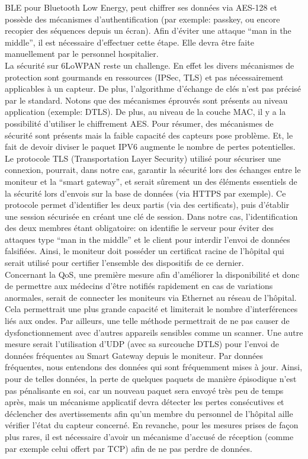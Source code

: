 \documentclass{article}
\begin{document}
BLE pour Bluetooth Low Energy, peut chiffrer ses données via AES-128 et possède des mécanismes d’authentification (par exemple: passkey,  ou encore recopier des séquences depuis un écran). Afin d’éviter une attaque “man in the middle”, il est nécessaire d’effectuer cette étape. Elle devra être faite manuellement par le personnel hospitalier.  
\\

La sécurité sur 6LoWPAN reste un challenge. En effet les divers mécanismes de protection sont gourmands en ressources (IPSec, TLS) et pas nécessairement applicables à un capteur. De plus, l’algorithme d’échange de clés n’est pas précisé par le standard. Notons que des mécanismes éprouvés sont présents au niveau application (exemple: DTLS). De plus, au niveau de la couche MAC, il y a la possibilité d’utiliser le chiffrement AES. Pour résumer, des mécanismes de sécurité sont présents mais la faible capacité des capteurs pose problème. Et, le fait de devoir diviser le paquet IPV6 augmente le nombre de pertes potentielles.
\\

Le protocole TLS (Transportation Layer Security) utilisé pour sécuriser une connexion, pourrait, dans notre cas, garantir la sécurité lors des échanges entre le moniteur et la “smart gateway”, et serait sûrement un des éléments essentiels de la sécurité lors d’envois sur la base de données (via HTTPS par exemple). Ce protocole permet d’identifier les deux partis (via des certificats), puis d’établir une session sécurisée en créant une clé de session. Dans notre cas, l’identification des deux membres étant obligatoire: on identifie le serveur pour éviter des attaques type “man in the middle” et le client pour interdir l’envoi de données falsifiées. Ainsi, le moniteur doit posséder un certificat racine de l’hôpital qui serait utilisé pour certifier l’ensemble des dispositifs de ce dernier.
\\

Concernant la QoS, une première mesure afin d’améliorer la disponibilité et donc de permettre aux médecins d’être notifiés rapidement en cas de variations anormales, serait de connecter les moniteurs via Ethernet au réseau de l’hôpital. Cela permettrait une plus grande capacité et limiterait le nombre d’interférences liés aux ondes. Par ailleurs, une telle méthode permettrait de ne pas causer de dysfonctionnement avec d’autres appareils sensibles comme un scanner. Une autre mesure serait l’utilisation d’UDP (avec sa surcouche DTLS) pour l’envoi de données fréquentes au Smart Gateway depuis le moniteur. Par données fréquentes, nous entendons des données qui sont fréquemment mises à jour. Ainsi, pour de telles données, la perte de quelques paquets de manière épisodique n’est pas pénalisante en soi, car un nouveau paquet sera envoyé très peu de temps après, mais un mécanisme applicatif devra détecter les pertes consécutives et déclencher des avertissements afin qu'un membre du personnel de l'hôpital aille vérifier l'état du capteur concerné. En revanche, pour les mesures prises de façon plus rares, il est nécessaire d’avoir un mécanisme d’accusé de réception (comme par exemple celui offert par TCP) afin de ne pas perdre de données.
\end{document}
